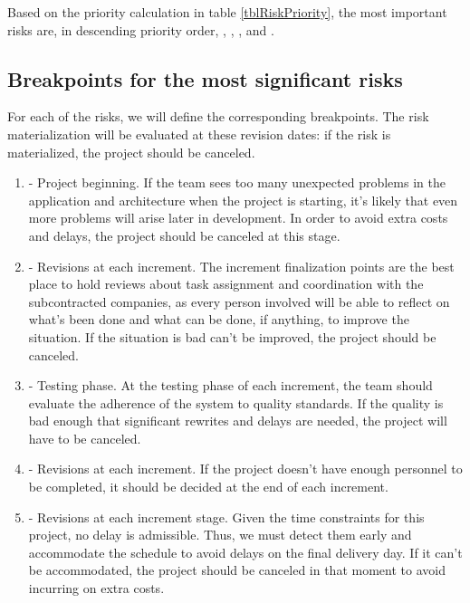 Based on the priority calculation in table \ref{tblRiskPriority}, the most important risks are, in descending priority order, , , ,  and .

\subsection{Breakpoints for the most significant risks}

For each of the risks, we will define the corresponding breakpoints. The risk materialization will be evaluated at these revision dates: if the risk is materialized, the project should be canceled.

\begin{enumerate}
\item {} - Project beginning. If the team sees too many unexpected problems in the application and architecture when the project is starting, it's likely that even more problems will arise later in development. In order to avoid extra costs and delays, the project should be canceled at this stage.
\item {} - Revisions at each increment. The increment finalization points are the best place to hold reviews about task assignment and coordination with the subcontracted companies, as every person involved will be able to reflect on what's been done and what can be done, if anything, to improve the situation. If the situation is bad can't be improved, the project should be canceled.
\item {} - Testing phase. At the testing phase of each increment, the team should evaluate the adherence of the system to quality standards. If the quality is bad enough that significant rewrites and delays are needed, the project will have to be canceled.
\item {} - Revisions at each increment. If the project doesn't have enough personnel to be completed, it should be decided at the end of each increment.
\item {} - Revisions at each increment stage. Given the time constraints for this project, no delay is admissible. Thus, we must detect them early and accommodate the schedule to avoid delays on the final delivery day. If it can't be accommodated, the project should be canceled in that moment to avoid incurring on extra costs.
\end{enumerate}
